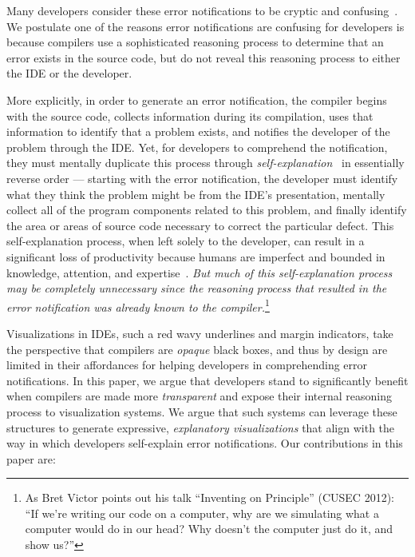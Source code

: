 \documentclass[conference]{IEEEtran}
\begin{document}

Many developers consider these error notifications to be cryptic and confusing~\cite{Traver2010}. We postulate one of the reasons error notifications are confusing for developers is because compilers use a sophisticated reasoning process to determine that an error exists in the source code, but do not reveal this reasoning process to either the IDE or the developer.

More explicitly, in order to generate an error notification, the compiler begins with the source code, collects information during its compilation, uses that information to identify that a problem exists, and notifies the developer of the problem through the IDE. Yet, for developers to comprehend the notification, they must mentally duplicate this process through \textit{self-explanation}~\cite{Parnin2011} in essentially reverse order --- starting with the error notification, the developer must identify what they think the problem might be from the IDE's presentation, mentally collect all of the program components related to this problem, and finally identify the area or areas of source code necessary to correct the particular defect. This self-explanation process, when left solely to the developer, can result in a significant loss of productivity because humans are imperfect and bounded in knowledge, attention, and expertise~\cite{Ko2005}. \textit{But much of this self-explanation process may be completely unnecessary since the reasoning process that resulted in the error notification was already known to the compiler.}\footnote{As Bret Victor points out his talk ``Inventing on Principle'' (CUSEC 2012): ``If we're writing our code on a computer, why are we simulating what a computer would do in our head? Why doesn't the computer just do it, and show us?''}

Visualizations in IDEs, such a red wavy underlines and margin indicators, take the perspective that compilers are \textit{opaque} black boxes, and thus by design are limited in their affordances for helping developers in comprehending error notifications. In this paper, we argue that developers stand to significantly benefit when compilers are made more \textit{transparent} and expose their internal reasoning process to visualization systems. We argue that such systems can leverage these structures to generate expressive, \textit{explanatory visualizations} that align with the way in which developers self-explain error notifications. Our contributions in this paper are:
\end{document}
